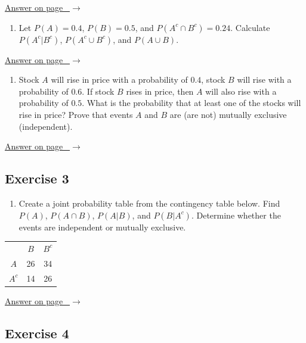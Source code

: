 \documentclass[
  11pt,
  letterpaper,
  DIV=11,
  numbers=noendperiod,
  oneside,
  open=any]{scrreprt}
\providecommand{\tightlist}{%
  \setlength{\itemsep}{0pt}\setlength{\parskip}{0pt}}\usepackage{longtable,booktabs,array}
\newcommand{\bsanswerref}[1]{%
  \par\nopagebreak\hypertarget{q-#1}{}\label{q-#1}%
  {\raggedleft\sffamily\footnotesize\hyperlink{a-#1}{\textcolor{bsaccent}{Answer on page \pageref{a-#1}\ $\rightarrow$}}\par}%
  \medskip}
\begin{document}
\bsanswerref{bsans73}

\begin{enumerate}
\def\labelenumi{\arabic{enumi}.}
\setcounter{enumi}{1}
\tightlist
\item
  Let \(P(A)=0.4\), \(P(B)=0.5\), and \(P(A^c \cap B^c)=0.24\).
  Calculate \(P(A^c|B^c)\), \(P(A^c \cup B^c)\), and \(P(A \cup B)\).
\end{enumerate}

\bsanswerref{bsans74}

\begin{enumerate}
\def\labelenumi{\arabic{enumi}.}
\setcounter{enumi}{2}
\tightlist
\item
  Stock \(A\) will rise in price with a probability of \(0.4\), stock
  \(B\) will rise with a probability of \(0.6\). If stock \(B\) rises in
  price, then \(A\) will also rise with a probability of \(0.5\). What
  is the probability that at least one of the stocks will rise in price?
  Prove that events \(A\) and \(B\) are (are not) mutually exclusive
  (independent).
\end{enumerate}

\bsanswerref{bsans75}

\subsection*{Exercise 3}\label{exercise-3-6}

\begin{enumerate}
\def\labelenumi{\arabic{enumi}.}
\tightlist
\item
  Create a joint probability table from the contingency table below.
  Find \(P(A)\), \(P(A \cap B)\), \(P(A|B)\), and \(P(B|A^c)\).
  Determine whether the events are independent or mutually exclusive.
\end{enumerate}

\begin{center}
\begin{tabular}{ccc}
\toprule
 & \(B\) & \(B^c\) \\
\(A\) & 26 & 34 \\
\(A^c\) & 14 & 26 \\
\bottomrule
\end{tabular}
\end{center}

\bsanswerref{bsans76}

\subsection*{Exercise 4}\label{exercise-4-5}
\end{document}
